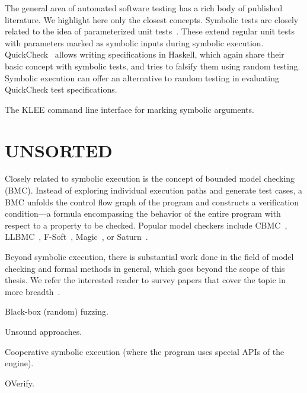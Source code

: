 The general area of automated software testing has a rich body of published literature. We highlight here only the closest concepts. Symbolic tests are closely related to the idea of parameterized unit tests~\cite{tillmann-puts}. These extend regular unit tests with parameters marked as symbolic inputs during symbolic execution.
%
QuickCheck~\cite{quickcheck} allows writing specifications in Haskell, which again share their basic concept with symbolic tests, and tries to falsify them using random testing.  Symbolic execution can offer an alternative to random testing in evaluating QuickCheck test specifications.

The KLEE command line interface for marking symbolic arguments.


\section{UNSORTED}

Closely related to symbolic execution is the concept of bounded model checking (BMC).  Instead of exploring individual execution paths and generate test cases, a BMC unfolds the control flow graph of the program and constructs a verification condition---a formula encompassing the behavior of the entire program with respect to a property to be checked.  Popular model checkers include CBMC~\cite{cbmc}, LLBMC~\cite{llbmc2012}, F-Soft~\cite{f-soft}, Magic~\cite{magic}, or Saturn~\cite{saturn}.

Beyond symbolic execution, there is substantial work done in the field of model checking and formal methods in general, which goes beyond the scope of this thesis.  We refer the interested reader to survey papers that cover the topic in more breadth~\cite{jhala2009software, woodcock2009formal}.

Black-box (random) fuzzing.

Unsound approaches.

Cooperative symbolic execution (where the program uses special APIs of the engine).

OVerify.





